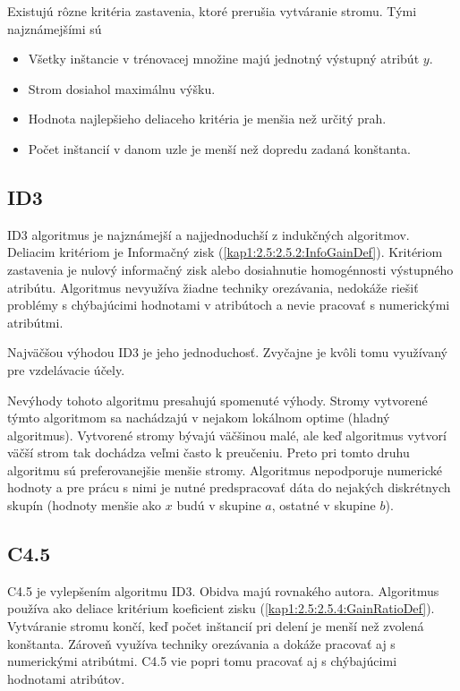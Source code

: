 Existujú rôzne kritéria zastavenia, ktoré prerušia vytváranie stromu. Tými najznámejšími sú

\begin{itemize}
\item Všetky inštancie v trénovacej množine majú jednotný výstupný atribút $y$.
\item Strom dosiahol maximálnu výšku.
\item Hodnota najlepšieho deliaceho kritéria je menšia než určitý prah.
\item Počet inštancií v danom uzle je menší než dopredu zadaná konštanta.
\end{itemize}

\subsection{ID3}\label{kap1:2.7:2.7.3:ID3}
ID3 algoritmus je najznámejší a najjednoduchší z indukčných algoritmov. Deliacim kritériom je Informačný zisk (\ref{kap1:2.5:2.5.2:InfoGainDef}). Kritériom zastavenia je nulový informačný zisk alebo dosiahnutie homogénnosti výstupného atribútu. Algoritmus nevyužíva žiadne techniky orezávania, nedokáže riešiť problémy s chýbajúcimi hodnotami v atribútoch a nevie pracovať s numerickými atribútmi.

Najväčšou výhodou ID3 je jeho jednoduchosť. Zvyčajne je kvôli tomu využívaný pre vzdelávacie účely. 

Nevýhody tohoto algoritmu presahujú spomenuté výhody. Stromy vytvorené týmto algoritmom sa nachádzajú v nejakom lokálnom optime (hladný algoritmus).
Vytvorené stromy bývajú väčšinou malé, ale keď algoritmus vytvorí väčší strom tak dochádza veľmi často k preučeniu. Preto pri tomto druhu algoritmu sú preferovanejšie menšie stromy. Algoritmus nepodporuje numerické hodnoty a pre prácu s nimi je nutné predspracovať dáta do nejakých diskrétnych skupín (hodnoty menšie ako $x$ budú v skupine $a$, ostatné v skupine $b$).
\subsection{C4.5}\label{kap1:2.7:2.7.4:C4.5}
C4.5 je vylepšením algoritmu ID3. Obidva majú rovnakého autora. Algoritmus používa ako deliace kritérium koeficient zisku (\ref{kap1:2.5:2.5.4:GainRatioDef}). Vytváranie stromu končí, keď počet inštancií pri delení je menší než zvolená konštanta. Zároveň využíva techniky orezávania a dokáže pracovať aj s numerickými atribútmi. C4.5 vie popri tomu  pracovať aj s chýbajúcimi hodnotami atribútov.

